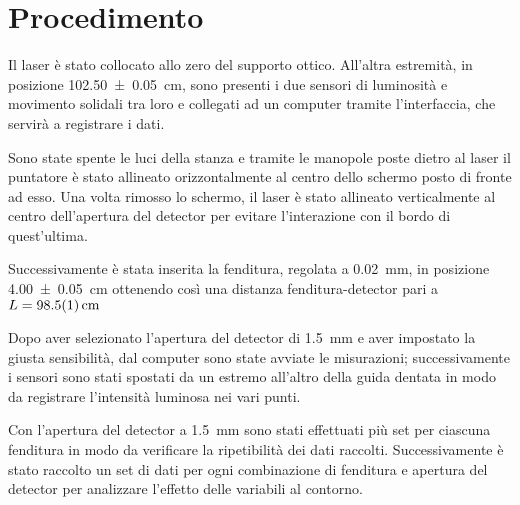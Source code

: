 \documentclass[../main.tex]{subfiles}
\begin{document}
\section{Procedimento}

Il laser è stato collocato allo zero del supporto ottico. All’altra estremità, in posizione \qty{102.50+-0.05}{\cm}, sono presenti i due sensori di luminosità e movimento solidali tra loro e collegati ad un computer tramite l’interfaccia, che servirà a registrare i dati.

Sono state spente le luci della stanza e tramite le manopole poste dietro al laser il puntatore è stato allineato orizzontalmente al centro dello schermo posto di fronte ad esso. Una volta rimosso lo schermo, il laser è stato allineato verticalmente al centro dell'apertura del detector per evitare l'interazione con il bordo di quest'ultima.

Successivamente è stata inserita la fenditura, regolata a \qty{0.02}{\milli\meter}, in posizione \qty{4.00+-0.05}{\cm} ottenendo così una distanza fenditura-detector pari a $L = \qty{98.5+-0.1}{\cm}$

Dopo aver selezionato l’apertura del detector di \qty{1.5}{\milli\meter} e aver impostato la giusta sensibilità, dal computer sono state avviate le misurazioni; successivamente i sensori sono stati spostati da un estremo all’altro della guida dentata in modo da registrare l'intensità luminosa nei vari punti.

Con l'apertura del detector a \qty{1.5}{\milli\meter} sono stati effettuati più set per ciascuna fenditura in modo da verificare la ripetibilità dei dati raccolti. Successivamente è stato raccolto un set di dati per ogni combinazione di fenditura e apertura del detector per analizzare l'effetto delle variabili al contorno.

\end{document}
